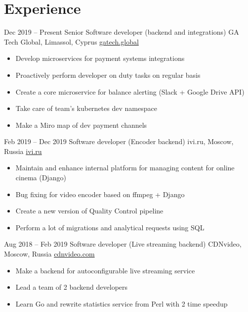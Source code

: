 \documentclass[11pt,a4paper]{moderncv}
\begin{document}
\maketitle
\vspace*{-5mm}

\section{Experience}
  \cventry
    {Dec 2019 – Present}
    {Senior Software developer (backend and integrations)}
    {GA Tech Global, Limassol, Cyprus}
    {\url{gatech.global}}
    {}
    {
      \begin{itemize}\setlength\itemindent{6pt}
        \item Develop microservices for payment systems integrations
        \item Proactively perform developer on duty tasks on regular basis
        \item Create a core microservice for balance alerting (Slack + Google Drive API)
        \item Take care of team's kubernetes dev namespace
        \item Make a Miro map of dev payment channels
      \end{itemize}
    }

  \cventry
    {Feb 2019 – Dec 2019}
    {Software developer (Encoder backend)}
    {ivi.ru, Moscow, Russia}
    {\url{ivi.ru}}
    {}
    {
      \begin{itemize}\setlength\itemindent{6pt}
        \item Maintain and enhance internal platform for managing content for online cinema (Django)
        \item Bug fixing for video encoder based on ffmpeg + Django
        \item Create a new version of Quality Control pipeline
        \item Perform a lot of migrations and analytical requests using SQL
      \end{itemize}
    }

  \cventry
    {Aug 2018 – Feb 2019}
    {Software developer (Live streaming backend)}
    {CDNvideo, Moscow, Russia}
    {\url{cdnvideo.com}}
    {}
    {
      \begin{itemize}\setlength\itemindent{6pt}
        \item Make a backend for autoconfigurable live streaming service
        \item Lead a team of 2 backend developers
        \item Learn Go and rewrite statistics service from Perl with 2 time speedup
      \end{itemize}
    }
\end{document}
